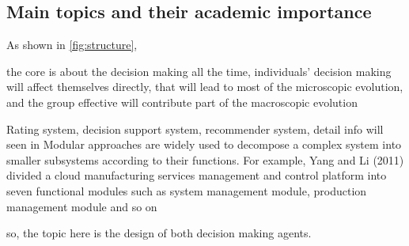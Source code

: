 
\subsection{Main topics and their academic importance}
As shown in \autoref{fig:structure},

the core is about the decision making all the time, individuals' decision making will affect themselves directly, that will lead to most of the microscopic evolution, and the group effective will contribute part of the macroscopic evolution 

Rating system, decision support system, recommender system,
detail info will seen in
Modular approaches are widely used to decompose a complex system into smaller subsystems according to their functions. For example, Yang and Li (2011) divided a cloud manufacturing services management and control platform into seven functional modules such as system management module, production management module and so on

so, the topic here is the design of both decision making agents.

